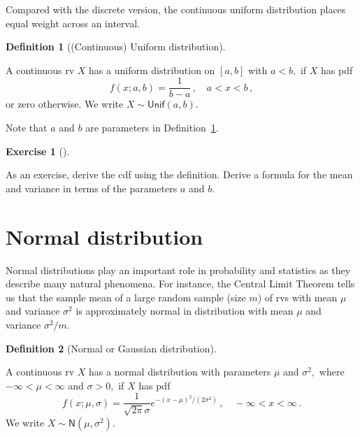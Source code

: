 \documentclass[
  a4paper,
  DIV=11,
  numbers=noendperiod,
  oneside]{scrreprt}
\theoremstyle{plain}
\theoremstyle{definition}
\theoremstyle{definition}
\newtheorem{definition}{Definition}[chapter]
\theoremstyle{definition}
\newtheorem{exercise}{Exercise}[chapter]
\theoremstyle{plain}
\theoremstyle{remark}
\begin{document}
Compared with the discrete version, the continuous uniform distribution
places equal weight across an interval.

\begin{definition}[(Continuous) Uniform
distribution]\protect\hypertarget{def-uniform-dist}{}\label{def-uniform-dist}

A continuous rv \(X\) has a uniform distribution on \([a,b]\) with
\(a<b,\) if \(X\) has pdf \[
 f(x; a,b) = \frac{1}{b-a}\,, 
 \quad a < x < b\,,
\] or zero otherwise. We write \(X \sim \mathsf{Unif}(a,b)\).

\end{definition}

\begin{tcolorbox}[enhanced jigsaw, toprule=.15mm, colbacktitle=quarto-callout-warning-color!10!white, breakable, toptitle=1mm, title=\textcolor{quarto-callout-warning-color}{\faExclamationTriangle}\hspace{0.5em}{Parameters}, left=2mm, leftrule=.75mm, colback=white, colframe=quarto-callout-warning-color-frame, coltitle=black, opacitybacktitle=0.6, rightrule=.15mm, titlerule=0mm, bottomrule=.15mm, bottomtitle=1mm, arc=.35mm, opacityback=0]

Note that \(a\) and \(b\) are parameters in
Definition~\ref{def-uniform-dist}.

\end{tcolorbox}

\begin{exercise}[]\protect\hypertarget{exr-uniform}{}\label{exr-uniform}

As an exercise, derive the cdf using the definition. Derive a formula
for the mean and variance in terms of the parameters \(a\) and \(b\).

\end{exercise}

\section{Normal distribution}\label{sec-normal-distribution}

Normal distributions play an important role in probability and
statistics as they describe many natural phenomena. For instance, the
Central Limit Theorem tells us that the sample mean of a large random
sample (size \(m\)) of rvs with mean \(\mu\) and variance \(\sigma^2\)
is approximately normal in distribution with mean \(\mu\) and variance
\(\sigma^2/m\).

\begin{definition}[Normal or Gaussian
distribution]\protect\hypertarget{def-normal-dist}{}\label{def-normal-dist}

A continuous rv \(X\) has a normal distribution with parameters \(\mu\)
and \(\sigma^2,\) where \(-\infty < \mu < \infty\) and \(\sigma > 0,\)
if \(X\) has pdf \[
 f(x; \mu, \sigma) = \frac{1}{\sqrt{2 \pi} \sigma}e^{-(x-\mu)^2/(2\sigma^2)}\,, 
 \quad -\infty < x < \infty \,.
\] We write \(X \sim \mathsf{N}(\mu, \sigma^2)\).

\end{definition}
\end{document}
